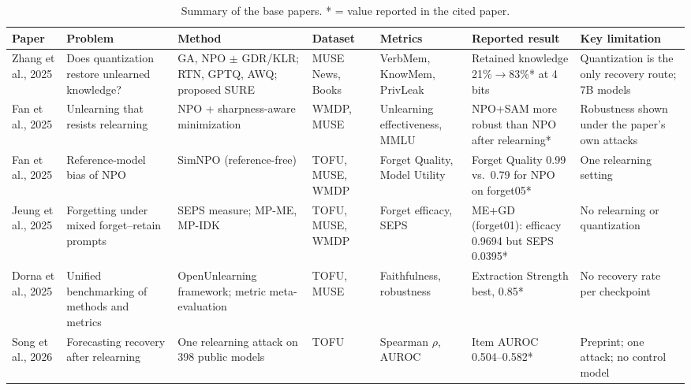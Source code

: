 \documentclass[conference]{IEEEtran}
\begin{document}
\begin{table}[t]
\caption{Summary of the base papers. * = value reported in the cited paper.}
\label{tab:base}
\centering
\scriptsize
\setlength{\tabcolsep}{3pt}
\begin{tabular}{@{}L{2.0cm}L{2.4cm}L{2.6cm}L{1.9cm}L{2.3cm}L{2.9cm}L{2.7cm}@{}}
\toprule
Paper & Problem & Method & Dataset & Metrics & Reported result & Key limitation \\
\midrule
Zhang et al., 2025 \cite{zhang2025quant} & Does quantization restore unlearned knowledge? & GA, NPO $\pm$ GDR/KLR; RTN, GPTQ, AWQ; proposed SURE & MUSE News, Books & VerbMem, KnowMem, PrivLeak & Retained knowledge 21\%$\to$83\%* at 4 bits & Quantization is the only recovery route; 7B models \\
Fan et al., 2025 \cite{fan2025sam} & Unlearning that resists relearning & NPO + sharpness-aware minimization & WMDP, MUSE & Unlearning effectiveness, MMLU & NPO+SAM more robust than NPO after relearning* & Robustness shown under the paper's own attacks \\
Fan et al., 2025 \cite{fan2025simnpo} & Reference-model bias of NPO & SimNPO (reference-free) & TOFU, MUSE, WMDP & Forget Quality, Model Utility & Forget Quality 0.99 vs.\ 0.79 for NPO on forget05* & One relearning setting \\
Jeung et al., 2025 \cite{jeung2025seps} & Forgetting under mixed forget--retain prompts & SEPS measure; MP-ME, MP-IDK & TOFU, MUSE, WMDP & Forget efficacy, SEPS & ME+GD (forget01): efficacy 0.9694 but SEPS 0.0395* & No relearning or quantization \\
Dorna et al., 2025 \cite{dorna2025openunlearning} & Unified benchmarking of methods and metrics & OpenUnlearning framework; metric meta-evaluation & TOFU, MUSE & Faithfulness, robustness & Extraction Strength best, 0.85* & No recovery rate per checkpoint \\
Song et al., 2026 \cite{song2026measure} & Forecasting recovery after relearning & One relearning attack on 398 public models & TOFU & Spearman $\rho$, AUROC & Item AUROC 0.504--0.582* & Preprint; one attack; no control model \\
\bottomrule
\end{tabular}
\end{table}
\end{document}
